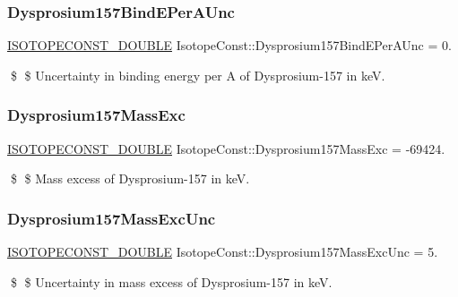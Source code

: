 \subsubsection{\texorpdfstring{Dysprosium157\+Bind\+E\+Per\+A\+Unc}{Dysprosium157BindEPerAUnc}}
{\footnotesize\ttfamily \mbox{\hyperlink{group___isotope_const-_macros_ga8f45a7272ce02c0b4c65c44636ed719a}{I\+S\+O\+T\+O\+P\+E\+C\+O\+N\+S\+T\+\_\+\+D\+O\+U\+B\+LE}} Isotope\+Const\+::\+Dysprosium157\+Bind\+E\+Per\+A\+Unc = 0.}

\$ \$ Uncertainty in binding energy per A of Dysprosium-\/157 in keV. \mbox{\label{group___isotope_const-_dysprosium-_dy157_ga8fa44c75f24dca623ef350cffd6620cd}} 
\subsubsection{\texorpdfstring{Dysprosium157\+Mass\+Exc}{Dysprosium157MassExc}}
{\footnotesize\ttfamily \mbox{\hyperlink{group___isotope_const-_macros_ga8f45a7272ce02c0b4c65c44636ed719a}{I\+S\+O\+T\+O\+P\+E\+C\+O\+N\+S\+T\+\_\+\+D\+O\+U\+B\+LE}} Isotope\+Const\+::\+Dysprosium157\+Mass\+Exc = -\/69424.}

\$ \$ Mass excess of Dysprosium-\/157 in keV. \mbox{\label{group___isotope_const-_dysprosium-_dy157_ga72f4a8bce5cae15a4ff1452d5e451f96}} 
\subsubsection{\texorpdfstring{Dysprosium157\+Mass\+Exc\+Unc}{Dysprosium157MassExcUnc}}
{\footnotesize\ttfamily \mbox{\hyperlink{group___isotope_const-_macros_ga8f45a7272ce02c0b4c65c44636ed719a}{I\+S\+O\+T\+O\+P\+E\+C\+O\+N\+S\+T\+\_\+\+D\+O\+U\+B\+LE}} Isotope\+Const\+::\+Dysprosium157\+Mass\+Exc\+Unc = 5.}

\$ \$ Uncertainty in mass excess of Dysprosium-\/157 in keV. \mbox{\label{group___isotope_const-_dysprosium-_dy157_gac95e3e05d08a5ed22434f999d69e1dce}} 
